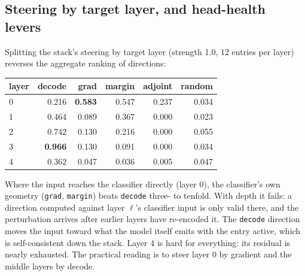 \subsection{Steering by target layer, and head-health levers}
\label{sec:steerlayer}

Splitting the stack's steering by target layer (strength 1.0, 12 entries
per layer) reverses the aggregate ranking of directions:

\begin{center}\small
\begin{tabular}{@{}lrrrrr@{}}
\toprule
layer & decode & grad & margin & adjoint & random \\
\midrule
0 & 0.216 & \textbf{0.583} & 0.547 & 0.237 & 0.034 \\
1 & 0.464 & 0.089 & 0.367 & 0.000 & 0.023 \\
2 & 0.742 & 0.130 & 0.216 & 0.000 & 0.055 \\
3 & \textbf{0.966} & 0.130 & 0.091 & 0.000 & 0.034 \\
4 & 0.362 & 0.047 & 0.036 & 0.005 & 0.047 \\
\bottomrule
\end{tabular}
\end{center}

Where the input reaches the classifier directly (layer 0), the
classifier's own geometry (\texttt{grad}, \texttt{margin}) beats
\texttt{decode} three- to tenfold. With depth it fails: a direction
computed against layer $\ell$'s classifier input is only valid there, and
the perturbation arrives after earlier layers have re-encoded it. The
\texttt{decode} direction moves the input toward what the model itself
emits with the entry active, which is self-consistent down the stack. Layer
4 is hard for everything: its residual is nearly exhausted. The practical
reading is to steer layer 0 by gradient and the middle layers by decode.

